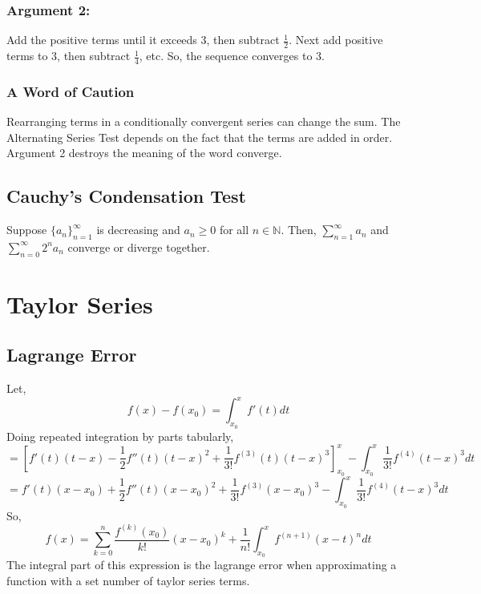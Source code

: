 \documentclass[../main.tex]{subfiles}
\begin{document}
        \subsubsection{Argument 2:}
            Add the positive terms until it exceeds $3$, then subtract $\frac{1}{2}$. Next add positive terms
            to $3$, then subtract $\frac{1}{4}$, etc. So, the sequence converges to $3$.

        \subsubsection{A Word of Caution}
            Rearranging terms in a conditionally convergent series can change the sum. The Alternating Series Test depends
            on the fact that the terms are added in order. Argument 2 destroys the meaning of the word converge.

    \subsection{Cauchy's Condensation Test}
        Suppose $\{a_{n}\}_{n=1}^{\infty}$ is decreasing and $a_{n}\geq 0$ for all $n\in \mathbb{N}$.
        Then, $\sum_{n=1}^{\infty}a_{n}$ and $\sum_{n=0}^{\infty}2^{n}a_{n}$ converge or diverge together.
    

\section{Taylor Series}
    \subsection{Lagrange Error}
        Let,
        $$f(x)-f(x_{0})=\int_{x_{0}}^{x}f'(t)dt$$
        Doing repeated integration by parts tabularly,
        $$=\left[f'(t)(t-x)-\frac{1}{2}f''(t)(t-x)^{2}+\frac{1}{3!}f^{(3)}(t)(t-x)^{3}\right]_{x_{0}}^{x}-\int_{x_{0}}^{x}\frac{1}{3!}f^{(4)}(t-x)^{3}dt$$
        $$=f'(t)(x-x_{0})+\frac{1}{2}f''(t)(x-x_{0})^{2}+\frac{1}{3!}f^{(3)}(x-x_{0})^{3}-\int_{x_{0}}^{x}\frac{1}{3!}f^{(4)}(t-x)^{3}dt$$
        So,
        $$f(x)=\sum_{k=0}^{n}\frac{f^{(k)}(x_{0})}{k!}(x-x_{0})^{k}+\frac{1}{n!}\int_{x_{0}}^{x}f^{(n+1)}(x-t)^{n}dt$$
        The integral part of this expression is the lagrange error when approximating a function with a set number of taylor series terms.
\end{document}
